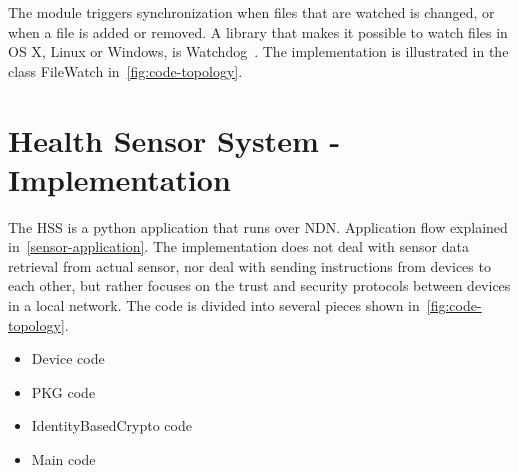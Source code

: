 


The module triggers synchronization when files that are watched is changed, or when a file is added or removed.
A library that makes it possible to watch files in OS X, Linux or Windows, is Watchdog~\cite{watchdog}. 
The implementation is illustrated in the class FileWatch in~\autoref{fig:code-topology}.

\section{Health Sensor System - Implementation}
The \gls{HSS} is a python application that runs over \gls{NDN}.
Application flow explained in~\autoref{sensor-application}.
The implementation does not deal with sensor data retrieval from actual sensor, nor deal with sending instructions from devices to each other, but rather focuses on the trust and security protocols between devices in a local network.
The code is divided into several pieces shown in~\autoref{fig:code-topology}.

\begin{itemize}
  \item Device code~\cite[device.py]{garseg15}
  \item \gls{PKG} code~\cite[publicKeyGenerator.py]{garseg15}
  \item IdentityBasedCrypto code~\cite[identityBasedCrypto.py]{garseg15}
  \item Main code~\cite[application.py]{garseg15}
\end{itemize}

